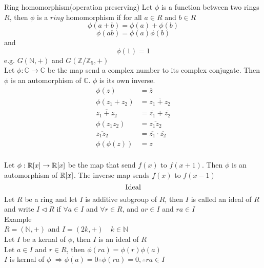 \documentclass{book}
\newcommand{\polyringr}[2][R]{\mathbb{#1}\scalebox{1}[.95]{[}#2\scalebox{1}[.95]{]}}
\begin{document}
\newpage
Ring homomorphism(operation preserving)
Let $\phi$ is a function between two rings $R$, then $\phi$ is a $\mathit{ring}$ homomorphism if
for all $a \in R$ and $b \in R$ 
\[\phi(a+b) = \phi(a) + \phi(b)\] 
\[\phi(ab) = \phi(a)\phi(b)\]
and \[\phi(1) = 1\]
e.g. $G(\mathbb{N}, +)$ and $G(\mathbb{Z}/\mathbb{Z}_5, +)$\\

Let $\phi: \mathbb{C} \rightarrow \mathbb{C}$ be the map send a complex number to its complex conjugate. Then $\phi$ is an automorphism of $\mathbb{C}$. 
$\phi$ is its own inverse.\\

\begin{equation}
\begin{aligned}
\phi(z) &= \overline{z}\\
\phi(z_1 + z_2) &= \overline{z_1 + z_2}\\
\overline{z_1 + z_2} &= \overline{z_1} + \overline{z_2}\\
\phi(z_1 z_2) &= \overline{z_1 z_2}\\
\overline{z_1 z_2} &= \overline{z_1} \cdot \overline{z_2} \nonumber\\
\phi(\phi(z)) &= z\\
\end{aligned}
\end{equation}

Let $\phi: \polyringr{x} \rightarrow  \polyringr{x}$ be the map that send $f(x)$ to $f(x+1)$. Then $\phi$ is an automorphism of $\polyringr{x}$.   
The inverse map sends $f(x)$ to $f(x-1)$\\

\[ \text{Ideal}\\ \]
Let $R$ be a ring and let $I$ is additive subgroup of $R$, then $I$ is called an ideal of $R$ and write $I \triangleleft R$ 
\quad if $\forall a \in I$ and $\forall r \in R $, and $ ar \in I$ and $ra \in I$\\

Example\\
$R = (\mathbb{N}, +)$ and $I = (2k, +) \quad k \in \mathbb{N}$\\

Let $I$ be a kernal of $\phi$, then $I$ is an ideal of $R$\\
Let $a \in I$ and $r \in R$, then $\phi(ra) = \phi(r)\phi(a)$\\
$I$ is kernal of $\phi$ $\Rightarrow \phi(a) = 0 \therefore \phi(ra) = 0, \therefore ra \in I$\\
\end{document}
